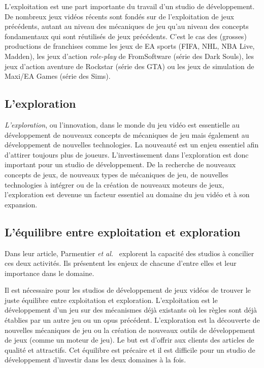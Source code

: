 L'exploitation est une part importante du travail d'un studio de développement.
De nombreux jeux vidéos récents sont fondés sur de l'exploitation de jeux précédents, autant au niveau des mécaniques de jeu qu'au niveau des concepts fondamentaux qui sont r\'eutilis\'es de jeux précédents.
C'est le cas des (grosses) productions de franchises comme les jeux de EA sports (FIFA, NHL, NBA Live, Madden), les jeux d'action \emph{role-play} de FromSoftware (série des Dark Souls), les jeux d'action aventure de Rockstar (série des GTA) ou les jeux de simulation de Maxi/EA Games (série des Sims). 

\subsection{L'exploration}
\emph{L'exploration}, ou l'innovation, dans le monde du jeu vidéo est essentielle au développement de nouveaux concepts de mécaniques de jeu mais également au développement de nouvelles technologies.
La nouveauté est un enjeu essentiel afin d'attirer toujours plus de joueurs.
L'investissement dans l'exploration est donc important pour un studio de développement.
De la recherche de nouveaux concepts de jeux, de nouveaux types de mécaniques de jeu, de nouvelles technologies à intégrer ou de la création de nouveaux moteurs de jeux, l'exploration est devenue un facteur essentiel au domaine du jeu vidéo et à son expansion.


\subsection{L'équilibre entre exploitation et exploration}
Dans leur article, Parmentier \emph{et al.}~\cite{ParmentierGuy2009Iecd} explorent la capacité des studios à concilier ces deux activités.
Ils présentent les enjeux de chacune d'entre elles et leur importance dans le domaine.

Il est nécessaire pour les studios de développement de jeux vidéos de trouver le juste équilibre entre exploitation et exploration.
L'exploitation est le développement d'un jeu sur des mécanismes déjà existants où les règles sont déjà établies par un autre jeu ou un opus précédent.
L'exploration est la découverte de nouvelles mécaniques de jeu ou la création de nouveaux outils de développement de jeux (comme un moteur de jeu).
Le but est d'offrir aux clients des articles de qualité et attractifs.
Cet équilibre est précaire et il est difficile pour un studio de développement d'investir dans les deux domaines à la fois. 



